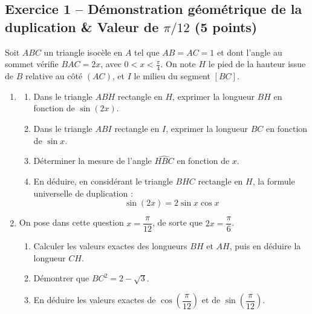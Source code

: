 \documentclass[11pt,a4paper]{article}
\begin{document}
\vspace{0.2cm}

\subsection*{Exercice 1 -- Démonstration géométrique de la duplication \& Valeur de $\pi/12$ \hfill (5 points)}

Soit $ABC$ un triangle isocèle en $A$ tel que $AB = AC = 1$ et dont l'angle au sommet vérifie $\widehat{BAC} = 2x$, avec $0 < x < \frac{\pi}{4}$.
On note $H$ le pied de la hauteur issue de $B$ relative au côté $(AC)$, et $I$ le milieu du segment $[BC]$.

\begin{enumerate}
    \item 
    \begin{enumerate}
        \item Dans le triangle $ABH$ rectangle en $H$, exprimer la longueur $BH$ en fonction de $\sin(2x)$.
        \item Dans le triangle $ABI$ rectangle en $I$, exprimer la longueur $BC$ en fonction de $\sin x$.
        \item Déterminer la mesure de l'angle $\widehat{HBC}$ en fonction de $x$.
        \item En déduire, en considérant le triangle $BHC$ rectangle en $H$, la formule universelle de duplication :
        \[
        \sin(2x) = 2 \sin x \cos x
        \]
    \end{enumerate}
    \item On pose dans cette question $x = \dfrac{\pi}{12}$, de sorte que $2x = \dfrac{\pi}{6}$.
    \begin{enumerate}
        \item Calculer les valeurs exactes des longueurs $BH$ et $AH$, puis en déduire la longueur $CH$.
        \item Démontrer que $BC^2 = 2 - \sqrt{3}$.
        \item En déduire les valeurs exactes de $\cos\left(\dfrac{\pi}{12}\right)$ et de $\sin\left(\dfrac{\pi}{12}\right)$.
    \end{enumerate}
\end{enumerate}

\vspace{0.3cm}

\end{document}
